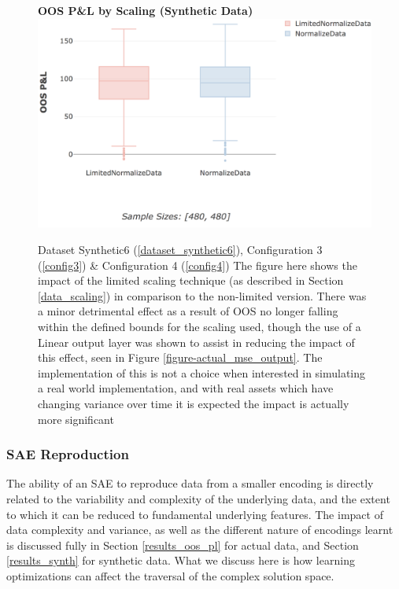 \documentclass[a4paper,11pt,oneside]{article}
\theoremstyle{plain}
\theoremstyle{definition}
\begin{document}
	\begin{figure}[H]
		\centering
		\textbf{OOS P\&L by Scaling (Synthetic Data)} 
		\includegraphics[scale=0.4]{images/results/8_6_complexity/oos_scaling.png}
		\caption[OOS P\&L by Scaling (Synthetic Data)]{Dataset Synthetic6  (\ref{dataset_synthetic6}), Configuration 3 (\ref{config3}) \& Configuration 4 (\ref{config4})
				\newline The figure here shows the impact of the limited scaling technique (as described in Section \ref{data_scaling}) in comparison to the non-limited version. There was a minor detrimental effect as a result of OOS no longer falling within the defined bounds for the scaling used, though the use of a Linear output layer was shown to assist in reducing the impact of this effect, seen in Figure \ref{figure-actual_mse_output}. The implementation of this is not a choice when interested in simulating a real world implementation, and with real assets which have changing variance over time it is expected the impact is actually more significant }
		\label{figure-synth_pl_scaling}
	\end{figure}


	
	\subsubsection{SAE Reproduction}\label{results_sae_training}

	The ability of an SAE to reproduce data from a smaller encoding is directly related to the variability and complexity of the underlying data, and the extent to which it can be reduced to fundamental underlying features. The impact of data complexity and variance, as well as the different nature of encodings learnt is discussed fully in Section \ref{results_oos_pl} for actual data, and Section \ref{results_synth} for synthetic data. What we discuss here is how learning optimizations can affect the traversal of the complex solution space. \newline
	
\end{document}
